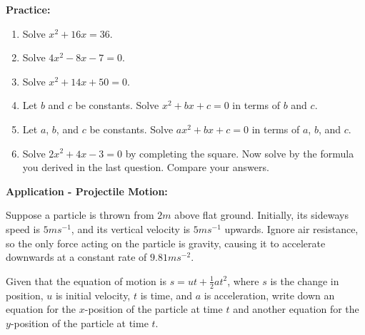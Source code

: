\documentclass{article}
\begin{document}
\vfill
\clearpage


{\bf Practice:}

\vspace{5mm}

\begin{enumerate}
\item Solve $x^2+16x=36$.
\item Solve $4x^2-8x-7=0$.
\item Solve $x^2+14x+50=0$.
\item Let $b$ and $c$ be constants. Solve $x^2+bx+c=0$ in terms of $b$ and $c$.
\item Let $a$, $b$, and $c$ be constants. Solve $ax^2+bx+c=0$ in terms of $a$, $b$, and $c$.
\item Solve $2x^2+4x-3=0$ by completing the square. Now solve by the formula you derived in the last question. Compare your answers.
\end{enumerate}

\clearpage

{\bf Application - Projectile Motion:}

\vspace{5mm}

Suppose a particle is thrown from $2m$ above flat ground. Initially, its sideways speed is $5ms^{-1}$, and its vertical velocity is $5ms^{-1}$ upwards. Ignore air resistance, so the only force acting on the particle is gravity, causing it to accelerate downwards at a constant rate of $9.81ms^{-2}$.

\begin{center}
\end{center}


Given that the equation of motion is $s=ut+\frac{1}{2}at^2$, where $s$ is the change in position, $u$ is initial velocity, $t$ is time, and $a$ is acceleration, write down an equation for the $x$-position of the particle at time $t$ and another equation for the $y$-position of the particle at time $t$.

\vspace{4cm}
\end{document}
